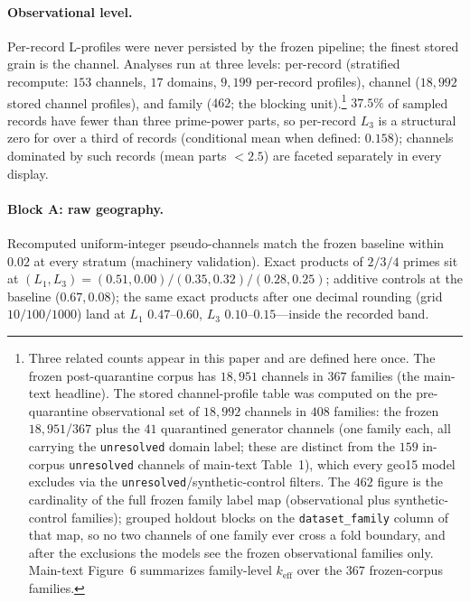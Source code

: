 \documentclass[12pt]{article}
\newcommand{\keff}{k_{\mathrm{eff}}}
\begin{document}
\paragraph{Observational level.}
Per-record L-profiles were never persisted by the frozen pipeline; the finest
stored grain is the channel. Analyses run at three levels: per-record
(stratified recompute: $153$ channels, $17$ domains, $9{,}199$ per-record
profiles), channel ($18{,}992$ stored channel profiles), and family ($462$; the blocking
unit).\footnote{Three related counts appear in this paper and are defined
here once. The frozen post-quarantine corpus has $18{,}951$ channels in $367$
families (the main-text headline). The stored channel-profile table was
computed on the pre-quarantine observational set of $18{,}992$ channels in
$408$ families: the frozen $18{,}951$/$367$ plus the $41$ quarantined
generator channels (one family each, all carrying the \texttt{unresolved}
domain label; these are distinct from the $159$ in-corpus
\texttt{unresolved} channels of main-text Table~1), which every geo15 model
excludes via the \texttt{unresolved}/synthetic-control filters. The $462$ figure is the
cardinality of the full frozen family label map (observational plus
synthetic-control families); grouped holdout blocks on the
\texttt{dataset\_family} column of that map, so no two channels of one
family ever cross a fold boundary, and after the exclusions the models see
the frozen observational families only. Main-text Figure~6 summarizes
family-level $\keff$ over the $367$ frozen-corpus families.}
$37.5\%$ of sampled records have fewer than three prime-power parts, so
per-record $L_3$ is a structural zero for over a third of records
(conditional mean when defined: $0.158$); channels dominated by such records
(mean parts $< 2.5$) are faceted separately in every display.

\paragraph{Block A: raw geography.}
Recomputed uniform-integer pseudo-channels match the frozen baseline within
$0.02$ at every stratum (machinery validation). Exact products of $2/3/4$
primes sit at $(L_1, L_3) = (0.51, 0.00) / (0.35, 0.32) / (0.28, 0.25)$;
additive controls at the baseline ($0.67, 0.08$); the same exact products
after one decimal rounding (grid $10/100/1000$) land at
$L_1$ $0.47$--$0.60$, $L_3$ $0.10$--$0.15$---inside the recorded band.
\end{document}
